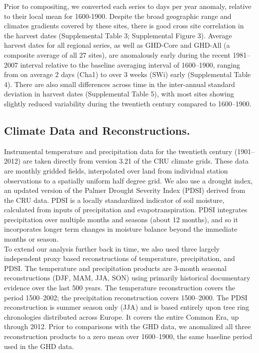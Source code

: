 \documentclass[final]{nature}
\begin{document}
\begin{methods}
\indent Prior to compositing, we converted each series to days per year anomaly, relative to their local mean for 1600-1900. Despite the broad geographic range and climates gradients covered by these sites, there is good cross site correlation in the harvest dates (Supplemental Table 3; Supplemental Figure 3).  Average harvest dates for all regional series, as well as GHD-Core and GHD-All (a composite average of all 27 sites), are anomalously early during the recent 1981--2007 interval relative to the baseline averaging interval of 1600--1900, ranging from on average 2 days (Cha1) to over 3 weeks (SWi) early (Supplemental Table 4). There are also small differences across time in the inter-annual standard deviation in harvest dates (Supplemental Table 5), with most sites showing slightly reduced variability during the twentieth century compared to 1600--1900.

\subsection{Climate Data and Reconstructions.}
\noindent Instrumental temperature and precipitation data for the twentieth century (1901--2012) are taken directly from version 3.21 of the CRU climate grids\cite{Harris2014}. These data are monthly gridded fields, interpolated over land from individual station observations to a spatially uniform half degree grid. We also use a drought index, an updated version of the Palmer Drought Severity Index (PDSI\cite{Palmer:1965}) derived from the CRU data\cite{Schrier2013}. PDSI is a locally standardized indicator of soil moisture, calculated from inputs of precipitation and evapotranspiration. PDSI integrates precipitation over multiple months and seasons (about 12 months), and so it incorporates longer term changes in moisture balance beyond the immediate months or season.\\
\indent To extend our analysis further back in time, we also used three largely independent proxy based reconstructions of temperature\cite{Luterbacher2004}, precipitation\cite{Pauling2006}, and PDSI\cite{CookOWDA2015}. The temperature and precipitation products are 3-month seasonal reconstructions (DJF, MAM, JJA, SON) using primarily historical documentary evidence over the last 500 years. The temperature reconstruction covers the period 1500--2002; the precipitation reconstruction covers 1500--2000. The PDSI reconstruction is summer season only (JJA) and is based entirely upon tree ring chronologies distributed across Europe. It covers the entire Common Era, up through 2012. Prior to comparisons with the GHD data, we anomalized all three reconstruction products to a zero mean over 1600--1900, the same baseline period used in the GHD data.


\end{methods}
\end{document}
